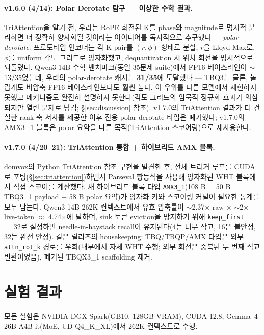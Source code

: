 \documentclass[10pt,twocolumn]{article}
\begin{document}
\paragraph{v1.6.0 (4/14): Polar Derotate 탐구 --- 이상한 수학 결과.}
TriAttention을 알기 전, 우리는 RoPE 회전된 K를 phase와 magnitude로 명시적 분리하면 더 정확히 양자화될 것이라는 아이디어를 독자적으로 추구했다 --- \emph{polar derotate}. 프로토타입 인코더는 각 K pair를 $(r, \phi)$ 형태로 분할, $r$을 Lloyd-Max로, $\phi$를 uniform 각도 그리드로 양자화했고, dequantization 시 위치 회전을 명시적으로 되돌렸다. Qwen3-14B 수학 벤치마크(동일 35문제 suite)에서 FP16 베이스라인이 $\sim$13/35였는데, 우리의 polar-derotate 캐시는 \textbf{31/35}에 도달했다 --- TBQ3는 물론, 놀랍게도 비압축 FP16 베이스라인보다도 훨씬 높다. 이 우위를 다른 모델에서 재현하지 못했고 메커니즘도 완전히 설명하지 못한다(각도 그리드의 암묵적 정규화 효과가 의심되지만 열린 문제로 남김; \S\ref{sec:discussion} 참조). v1.7.0의 TriAttention 결과가 더 건실한 rank-축 서사를 제공한 이후 전용 polar-derotate 타입은 폐기했다; v1.7.0의 AMX3\_1 블록은 polar 요약을 다른 목적(TriAttention 스코어링)으로 재사용한다.

\paragraph{v1.7.0 (4/20--21): TriAttention 통합 + 하이브리드 AMX 블록.}
domvox의 Python TriAttention 참조 구현을 발견한 후, 전체 트리거 루프를 CUDA로 포팅(\S\ref{sec:triattention})하면서 Parseval 항등식을 사용해 양자화된 WHT 블록에서 직접 스코어를 계산했다. 새 하이브리드 블록 타입 \texttt{AMX3\_1}(108 B = 50 B TBQ3\_1 payload + 58 B polar 요약)가 양자화 키와 스코어링 커널이 필요한 통계를 모두 담는다. Qwen3-14B 262K 컨텍스트에서 유효 압축률이 $\sim$2.37$\times$ raw $\times$ $\sim$2$\times$ live-token $\approx$ 4.74$\times$에 달하며, sink 토큰 eviction을 방지하기 위해 \texttt{keep\_first} $= 32$로 설정하면 needle-in-haystack recall이 유지된다(4는 너무 작고, 16은 불안정, 32는 완전 안정). 같은 릴리즈의 housekeeping: TBQ/TBQP/AMX 타입은 외부 \texttt{attn\_rot\_k} 경로를 우회(내부에서 자체 WHT 수행; 외부 회전은 중복된 두 번째 직교 변환이었음), 폐기된 TBQX3\_1 scaffolding 제거.

\section{실험 결과}
\label{sec:results}

모든 실험은 NVIDIA DGX Spark(GB10, 128GB VRAM), CUDA 12.8, Gemma~4 26B-A4B-it(MoE, UD-Q4\_K\_XL)에서 262K 컨텍스트로 수행.
\end{document}

